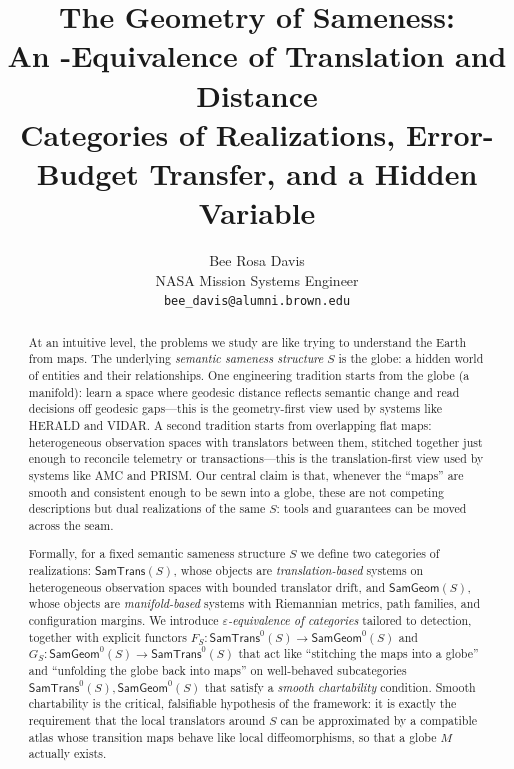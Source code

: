 \documentclass[11pt]{article}
\title{\textbf{The Geometry of Sameness:}\\[0.25ex]
\textbf{An \boldsymbol{$\varepsilon$}-Equivalence of Translation and Distance}\\[0.5ex]
\large Categories of Realizations, Error-Budget Transfer, and a Hidden Variable}
\author{Bee Rosa Davis\\
\small NASA Mission Systems Engineer\\
\small \texttt{bee\_davis@alumni.brown.edu}}
\date{}
\newcommand{\SamTrans}{\mathsf{SamTrans}}
\newcommand{\SamGeom}{\mathsf{SamGeom}}
\begin{document}
\maketitle
\vspace{-1.5ex}

\begin{abstract}
At an intuitive level, the problems we study are like trying to understand the Earth from maps. 
The underlying \emph{semantic sameness structure} $S$ is the globe: a hidden world of entities and 
their relationships. One engineering tradition starts from the globe (a manifold): learn a space 
where geodesic distance reflects semantic change and read decisions off geodesic gaps—this is the 
geometry-first view used by systems like HERALD and VIDAR. A second tradition starts from overlapping 
flat maps: heterogeneous observation spaces with translators between them, stitched together just 
enough to reconcile telemetry or transactions—this is the translation-first view used by systems like 
AMC and PRISM. Our central claim is that, whenever the “maps” are smooth and consistent enough to be 
sewn into a globe, these are not competing descriptions but dual realizations of the same $S$: tools 
and guarantees can be moved across the seam.

Formally, for a fixed semantic sameness structure $S$ we define two categories of realizations: \label{sec:categories} 
$\SamTrans(S)$, whose objects are \emph{translation-based} systems on heterogeneous observation spaces 
with bounded translator drift, and $\SamGeom(S)$, whose objects are \emph{manifold-based} systems with 
Riemannian metrics, path families, and configuration margins. We introduce \emph{$\varepsilon$-equivalence 
of categories} tailored to detection, together with explicit functors 
$F_S : \SamTrans^0(S) \to \SamGeom^0(S)$ and $G_S : \SamGeom^0(S) \to \SamTrans^0(S)$ that act like 
“stitching the maps into a globe” and “unfolding the globe back into maps” on well-behaved subcategories 
$\SamTrans^0(S), \SamGeom^0(S)$ that satisfy a \emph{smooth chartability} condition. Smooth chartability 
is the critical, falsifiable hypothesis of the framework: it is exactly the requirement that the local 
translators around $S$ can be approximated by a compatible atlas whose transition maps behave like 
local diffeomorphisms, so that a globe $M$ actually exists.


\end{abstract}
\end{document}
